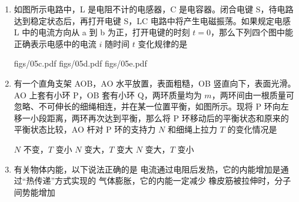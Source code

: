 \documentclass[\gkver]{gaokaozhenti}
\begin{document}
\begin{enumerate}
\onepicture[w=5.41cm]{}

{正常发光}
{比正常发光略亮}
{有可能被烧坏}


\item
如图所示电路中，L 是电阻不计的电感器，C 是电容器。闭合电键 S，待电路达到稳定状态后，再打开电键 S，LC 电路中将产生电磁振荡。如果规定电感 L 中的电流方向从 a 到 b 为正，打开电键的时刻 $t = 0$，那么下列四个图中能正确表示电感中的电流 $i$ 随时间 $t$ 变化规律的是

\onepicture[w=3.85cm]{}

{figs/05c.pdf}
{figs/05d.pdf}
{figs/05e.pdf}


\item
有一个直角支架 AOB，AO 水平放置，表面粗糙，OB 竖直向下，表面光滑。AO 上套有小环 P，OB 套有小环 Q，两环质量均为 $m$，两环间由一根质量可忽略、不可伸长的细绳相连，并在某一位置平衡，如图所示。现将 P 环向左移一小段距离，两环再次达到平衡，那么将 P 环移动后的平衡状态和原来的平衡状态比较，AO 杆对 P 环的支持力 $N$ 和细绳上拉力 $T$ 的变化情况是

\onepicture[h=4.38cm]{}

{$N$ 不变，$T$ 变小}
{$N$ 变大，$T$ 变大}
{$N$ 变大，$T$ 变小}


\item
有关物体内能，以下说法正确的是
{电流通过电阻后发热，它的内能增加是通过“热传递”方式实现的}
{气体膨胀，它的内能一定减少}
{橡皮筋被拉伸时，分子间势能增加}


\end{enumerate}
\end{document}
